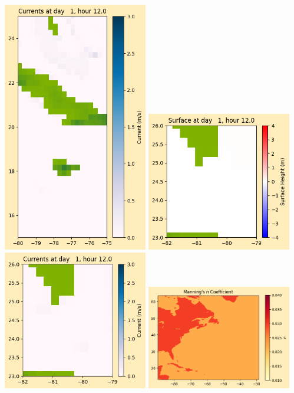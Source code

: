 \documentclass[11pt]{article}
\begin{document}
\includegraphics[width=0.475\textwidth]{frame0018fig1008.png}
\vskip 10pt 
\includegraphics[width=0.475\textwidth]{frame0018fig1009.png}
\includegraphics[width=0.475\textwidth]{frame0018fig1010.png}
\vskip 10pt 
\includegraphics[width=0.475\textwidth]{frame0018fig1011.png}
\end{document}
